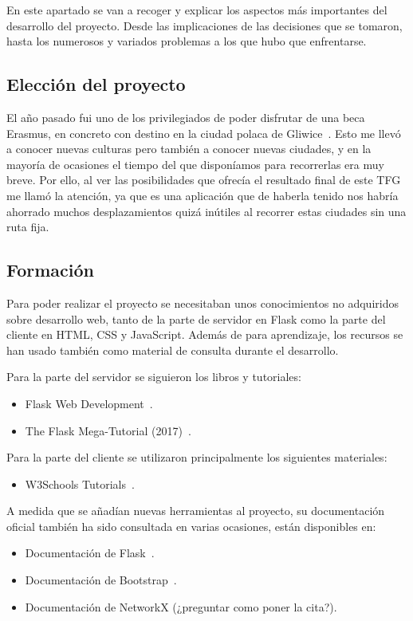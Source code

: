 
En este apartado se van a recoger y explicar los aspectos más importantes del desarrollo del proyecto. Desde las implicaciones de las decisiones que se tomaron, hasta los numerosos y variados problemas a los que hubo que enfrentarse.

\subsection{Elección del proyecto}

El año pasado fui uno de los privilegiados de poder disfrutar de una beca Erasmus, en concreto con destino en la ciudad polaca de Gliwice~\cite{wiki:gliwice}.
Esto me llevó a conocer nuevas culturas pero también a conocer nuevas ciudades, y en la mayoría de ocasiones el tiempo del que disponíamos para recorrerlas era muy breve. Por ello, al ver las posibilidades que ofrecía el resultado final de este TFG me llamó la atención, ya que es una aplicación que de haberla tenido nos habría ahorrado muchos desplazamientos quizá inútiles al recorrer estas ciudades sin una ruta fija.

\subsection{Formación}

Para poder realizar el proyecto se necesitaban unos conocimientos no adquiridos sobre desarrollo web, tanto de la parte de servidor en Flask como la parte del cliente en HTML, CSS y JavaScript. Además de para aprendizaje, los recursos se han usado también como material de consulta durante el desarrollo.

Para la parte del servidor se siguieron los libros y tutoriales:
\begin{itemize}
	\item Flask Web Development~\cite{grinberg2014flask}.
	\item The Flask Mega-Tutorial (2017)~\cite{grinberg-mega}.
\end{itemize}

Para la parte del cliente se utilizaron principalmente los siguientes
materiales:
\begin{itemize}
	\item W3Schools Tutorials~\cite{w3schools}.
\end{itemize}

A medida que se añadían nuevas herramientas al proyecto, su documentación
oficial también ha sido consultada en varias ocasiones, están disponibles en:
\begin{itemize}
	\item Documentación de Flask~\cite{doc:flask}.
	\item Documentación de Bootstrap~\cite{doc:bootstrap}.
	\item Documentación de NetworkX (¿preguntar como poner la cita?).
\end{itemize}
